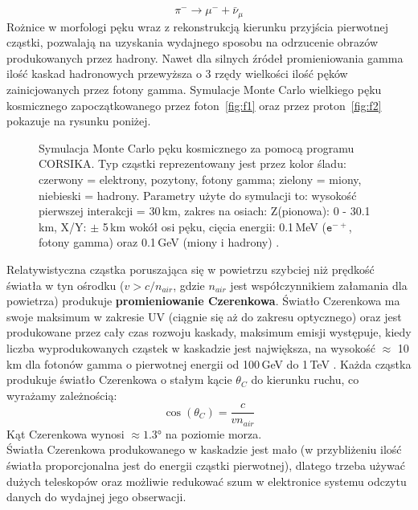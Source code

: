 \documentclass[a4paper,11pt,twoside]{article}
\begin{document}
\begin{equation*}
\pi^- \rightarrow \mu^- + \bar{\nu}_{\mu}
\end{equation*}
Rożnice w morfologi pęku wraz z rekonstrukcją kierunku przyjścia pierwotnej cząstki, pozwalają na uzyskania wydajnego sposobu na odrzucenie obrazów produkowanych przez hadrony. Nawet dla silnych źródeł promieniowania gamma ilość kaskad hadronowych przewyższa o 3 rzędy wielkości ilość pęków zainicjowanych przez fotony gamma. Symulacje Monte Carlo wielkiego pęku kosmicznego zapoczątkowanego przez foton~\ref{fig:f1} oraz przez proton~\ref{fig:f2} pokazuje na rysunku poniżej.
\begin{figure}[H]
\label{mc_pek}
  \begin{center}
  \hfill
  \caption{Symulacja Monte Carlo pęku kosmicznego za pomocą programu CORSIKA. Typ cząstki reprezentowany jest przez kolor śladu: czerwony = elektrony, pozytony, fotony gamma; zielony = miony, niebieski = hadrony. Parametry użyte do symulacji to: wysokość pierwszej interakcji = 30\,km, 
zakres na osiach: Z(pionowa): 0 - 30.1\,km, X/Y: $\pm$ 5\,km wokół osi pęku, cięcia energii: 0.1\,MeV ($\mathtt{e^{-+}}$, fotony gamma) oraz 0.1\,GeV (miony i hadrony) \cite{monte_carlo}.}
\end{center}
\end{figure}
Relatywistyczna cząstka poruszająca się w powietrzu szybciej niż prędkość światła w tyn ośrodku ($v > c/n_{air}$, gdzie $n_{air}$ jest współczynnikiem załamania dla powietrza) produkuje {\bf{promieniowanie Czerenkowa}}. Światło Czerenkowa ma swoje maksimum w zakresie UV (ciągnie się aż do zakresu optycznego) oraz jest produkowane przez cały czas rozwoju kaskady, maksimum emisji występuje, kiedy liczba wyprodukowanych cząstek w kaskadzie jest największa, na wysokość $\approx$ 10\,km dla fotonów gamma o pierwotnej energii od 100\,GeV do 1\,TeV \cite{IACT}. Każda cząstka produkuje światło Czerenkowa o stałym kącie $\theta_C$ do kierunku ruchu, co wyrażamy zależnością:
\begin{equation}
\cos (\theta_C) = \frac{c}{v n_{air}}
\end{equation}
Kąt Czerenkowa wynosi $\approx \ang{1.3}$ na poziomie morza. \\
Światła Czerenkowa produkowanego w kaskadzie jest mało (w przybliżeniu ilość światła proporcjonalna jest do energii cząstki pierwotnej), dlatego trzeba używać dużych teleskopów oraz możliwie redukować szum w elektronice systemu odczytu danych do wydajnej jego obserwacji. \\
\end{document}
